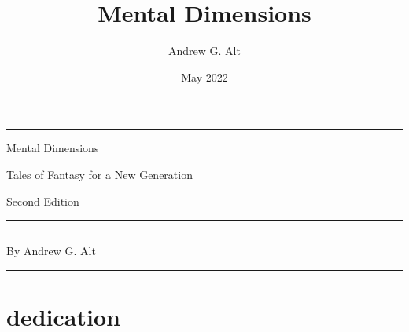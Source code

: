\documentclass[12pt,openright,draft,titlepage]{book}
\begin{document}
%
\sloppy

\author{Andrew G. Alt}
\title{Mental Dimensions}
\date{May 2022}




\frontmatter
\thispagestyle{empty}
\begin{center}
	\rule{4.5in}{2pt}

	\vspace{10pt}
	{\Huge Mental Dimensions}

	{\large Tales of Fantasy for a New Generation}

	{\small Second Edition}
	\rule{4.5in}{2pt}

	\vspace{3in}
	\rule{4.5in}{2pt}

	{\large By Andrew G. Alt}

	\rule{4.5in}{2pt}
\end{center}

\clearpage


\chapter{dedication}
\thispagestyle{empty}

\clearpage
\tableofcontents
\clearpage

\mainmatter

\thispagestyle{empty}



















\backmatter
\end{document}
